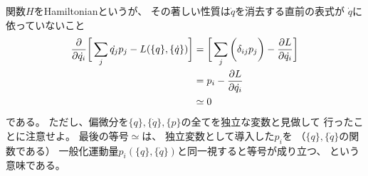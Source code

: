 関数$H$をHamiltonianというが、
その著しい性質は$\dot{q}$を消去する直前の表式が
$\dot{q}$に依っていないこと
\begin{align}
  \dfrac{\partial}{\partial \dot{q_i}}
  \bigg[
    \sum_j
      \dot{q_j} p_j
  - L(\{q\}, \{\dot{q}\})
  \bigg]
  &=
  \bigg[
    \sum_j\bigg(
      \delta_{ij} p_j
    \bigg)
  - \dfrac{\partial L}{\partial \dot{q_i}}
  \bigg]
\notag\\&=
    p_i
    - \dfrac{\partial L}{\partial \dot{q_i}}
\notag\\
  &\simeq 0
\end{align}
である。
ただし、偏微分を$\{q\},\{\dot{q}\},\{p\}$の全てを独立な変数と見做して
行ったことに注意せよ。
最後の等号$\simeq$は、
独立変数として導入した$p_i$を
（$\{q\},\{\dot{q}\}$の関数である）
一般化運動量$p_i(\{q\},\{\dot{q}\})$と同一視すると等号が成り立つ、
という意味である。

